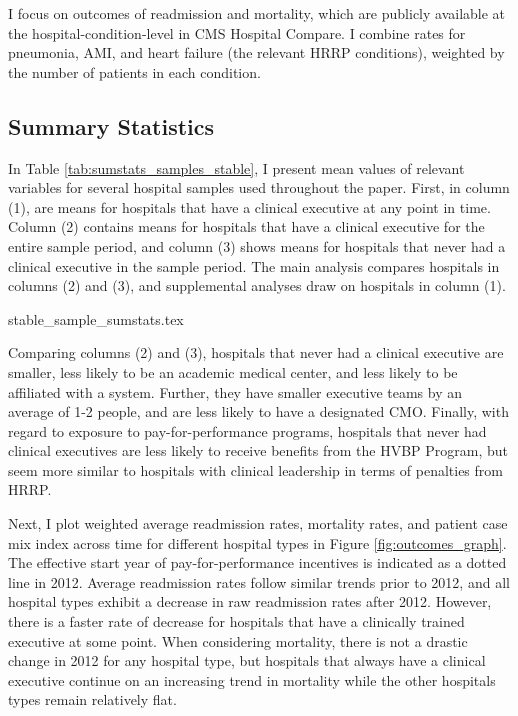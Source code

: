 \documentclass[12pt]{article}
\begin{document}
    I focus on outcomes of readmission and mortality, which are publicly available at the hospital-condition-level in CMS Hospital Compare. I combine rates for pneumonia, AMI, and heart failure (the relevant HRRP conditions), weighted by the number of patients in each condition. 

	\subsection{Summary Statistics}\label{sec:data}

    In Table \ref{tab:sumstats_samples_stable}, I present mean values of relevant variables for several hospital samples used throughout the paper. First, in column (1), are means for hospitals that have a clinical executive at any point in time. Column (2) contains means for hospitals that have a clinical executive for the entire sample period, and column (3) shows means for hospitals that never had a clinical executive in the sample period. The main analysis compares hospitals in columns (2) and (3), and supplemental analyses draw on hospitals in column (1). 

    {stable_sample_sumstats.tex}

    Comparing columns (2) and (3), hospitals that never had a clinical executive are smaller, less likely to be an academic medical center, and less likely to be affiliated with a system. Further, they have smaller executive teams by an average of 1-2 people, and are less likely to have a designated CMO. Finally, with regard to exposure to pay-for-performance programs, hospitals that never had clinical executives are less likely to receive benefits from the HVBP Program, but seem more similar to hospitals with clinical leadership in terms of penalties from HRRP. 

    Next, I plot weighted average readmission rates, mortality rates, and patient case mix index across time for different hospital types in Figure \ref{fig:outcomes_graph}. The effective start year of pay-for-performance incentives is indicated as a dotted line in 2012. Average readmission rates follow similar trends prior to 2012, and all hospital types exhibit a decrease in raw readmission rates after 2012. However, there is a faster rate of decrease for hospitals that have a clinically trained executive at some point. When considering mortality, there is not a drastic change in 2012 for any hospital type, but hospitals that always have a clinical executive continue on an increasing trend in mortality while the other hospitals types remain relatively flat. 
\end{document}
